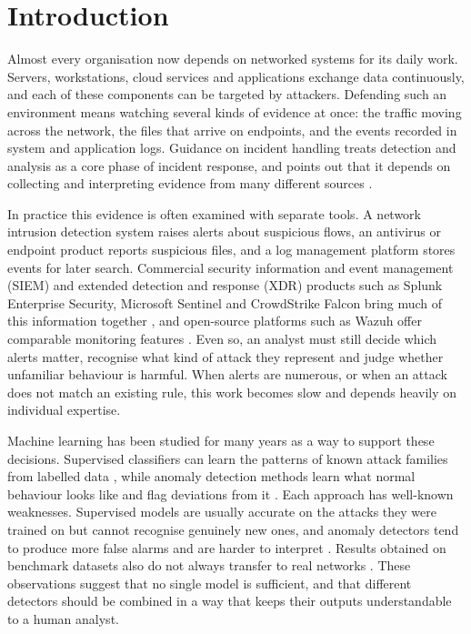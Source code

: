 \chapter{Introduction}

Almost every organisation now depends on networked systems for its daily work. Servers, workstations, cloud services and applications exchange data continuously, and each of these components can be targeted by attackers. Defending such an environment means watching several kinds of evidence at once: the traffic moving across the network, the files that arrive on endpoints, and the events recorded in system and application logs. Guidance on incident handling treats detection and analysis as a core phase of incident response, and points out that it depends on collecting and interpreting evidence from many different sources \cite{nist80061r3}.

In practice this evidence is often examined with separate tools. A network intrusion detection system raises alerts about suspicious flows, an antivirus or endpoint product reports suspicious files, and a log management platform stores events for later search. Commercial security information and event management (SIEM) and extended detection and response (XDR) products such as Splunk Enterprise Security, Microsoft Sentinel and CrowdStrike Falcon bring much of this information together \cite{splunkes,sentineldocs,crowdstrikefalcon}, and open-source platforms such as Wazuh offer comparable monitoring features \cite{wazuhdocs}. Even so, an analyst must still decide which alerts matter, recognise what kind of attack they represent and judge whether unfamiliar behaviour is harmful. When alerts are numerous, or when an attack does not match an existing rule, this work becomes slow and depends heavily on individual expertise.

Machine learning has been studied for many years as a way to support these decisions. Supervised classifiers can learn the patterns of known attack families from labelled data \cite{buczak2016survey}, while anomaly detection methods learn what normal behaviour looks like and flag deviations from it \cite{chandola2009anomaly}. Each approach has well-known weaknesses. Supervised models are usually accurate on the attacks they were trained on but cannot recognise genuinely new ones, and anomaly detectors tend to produce more false alarms and are harder to interpret \cite{sommer2010outside}. Results obtained on benchmark datasets also do not always transfer to real networks \cite{sommer2010outside,arp2022dos}. These observations suggest that no single model is sufficient, and that different detectors should be combined in a way that keeps their outputs understandable to a human analyst.

